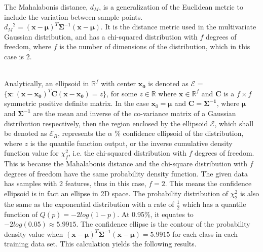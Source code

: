                        

                       The Mahalabonis distance, $d_{M}$, is a generalization of the Euclidean metric to include the variation between sample points.
                       \\${d_{M}}^2 = (\bm{x} - \bm{\mu})^T \bm{\Sigma}^{-1} (\bm{x}-\bm{\mu})$. It is the distance metric used in the multivariate Gaussian distribution, and has a chi-squared distribution with $f$ degrees of freedom,\cite{chisquared} where $f$ is the number of dimensions of the distribution, which in this case is 2. 
                       \\ \vspace{5mm}

                       \\ \vspace{5mm}
                       Analytically, an ellipsoid in $\mathbb{R}^f$ with center $\bm{x_{0}}$ is denoted as $\mathcal{E}$ = $ \{ \bm{x} : (\bm{x} - \bm{x_{0}})^{T} \textbf{C} (\bm{x} - \bm{x_{0}}) = z \} $, for some $z \in \mathbb{R}$ where $\bm{x} \in \mathbb{R}^f$ and $\textbf{C}$ is a $f \times f$ symmetric positive definite matrix.\cite{ellipsoid} 
                       In the case $\bm{x}_0 = \bm{\mu}$ and $\textbf{C} = \bm{\Sigma^{-1}}$, where $\bm{\mu}$ and $\bm{\Sigma^{-1}}$ are the mean and inverse of the co-variance matrix of a Gaussian distribution respectively, then the region enclosed by the ellipsoid $\mathcal{E}$, which shall be denoted as $\mathcal{E}_{R}$, represents the $\alpha$ \% confidence ellipsoid of the distribution, where $z$ is the quantile function output, or the inverse cumulative density function value
                       for $\chi^{2}_{f}$, i.e. the chi-squared distribution with $f$ degrees of freedom. This is because the Mahalabonis distance and the chi-square distribution with $f$ degrees of freedom have the same probability density function. The given data has samples with 2 features, thus in this case, $f=2$. This means the confidence ellipsoid is in fact an ellipse in 2D space. The probability distribution of $\chi_{2}^{2}$ is also the same as the exponential distribution with a
                           rate of $\frac{1}{2}$ which has a quantile function of $Q(p) = -2log(1-p)$. At 0.95\%, it equates to $-2log(0.05) \approx 5.9915$. The confidence ellipse is the contour of the probability density value when $(\bm{x} - \bm{\mu})^T \bm{\Sigma}^{-1} (\bm{x}-\bm{\mu}) = 5.9915$ for each class in each training data set. This calculation yields the following results.

